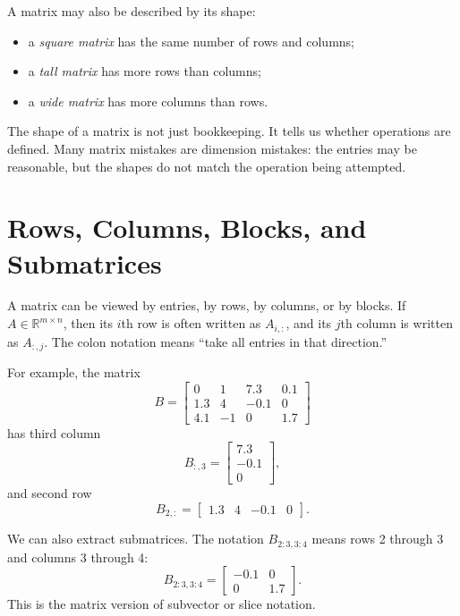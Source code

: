 A matrix may also be described by its shape:
\begin{itemize}
    \item a \emph{square matrix} has the same number of rows and columns;
    \item a \emph{tall matrix} has more rows than columns;
    \item a \emph{wide matrix} has more columns than rows.
\end{itemize}

The shape of a matrix is not just bookkeeping. It tells us whether operations are defined. Many matrix mistakes are dimension mistakes: the entries may be reasonable, but the shapes do not match the operation being attempted.

\section{Rows, Columns, Blocks, and Submatrices}
\label{mf:matrix-entries-rows-columns}
\label{mf:matrices-entries}
\label{mf:matrices-rows-columns}
\label{mf:submatrix-extraction}

A matrix can be viewed by entries, by rows, by columns, or by blocks. If \(A\in\mathbb{R}^{m\times n}\), then its \(i\)th row is often written as \(A_{i,:}\), and its \(j\)th column is written as \(A_{:,j}\). The colon notation means ``take all entries in that direction.''

For example, the matrix
\[
    B =
    \begin{bmatrix}
        0 & 1 & 7.3 & 0.1\\
        1.3 & 4 & -0.1 & 0\\
        4.1 & -1 & 0 & 1.7
    \end{bmatrix}
\]
has third column
\[
    B_{:,3}=\begin{bmatrix}7.3\\ -0.1\\ 0\end{bmatrix},
\]
and second row
\[
    B_{2,:}=\begin{bmatrix}1.3 & 4 & -0.1 & 0\end{bmatrix}.
\]

We can also extract submatrices. The notation \(B_{2:3,3:4}\) means rows 2 through 3 and columns 3 through 4:
\[
    B_{2:3,3:4}
    =
    \begin{bmatrix}
        -0.1 & 0\\
        0 & 1.7
    \end{bmatrix}.
\]
This is the matrix version of subvector or slice notation.

